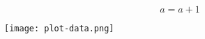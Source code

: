 \documentclass{article}
\begin{document}
$$    a = a + 1 $$





\texttt{[image: plot-data.png]}
\end{document}
